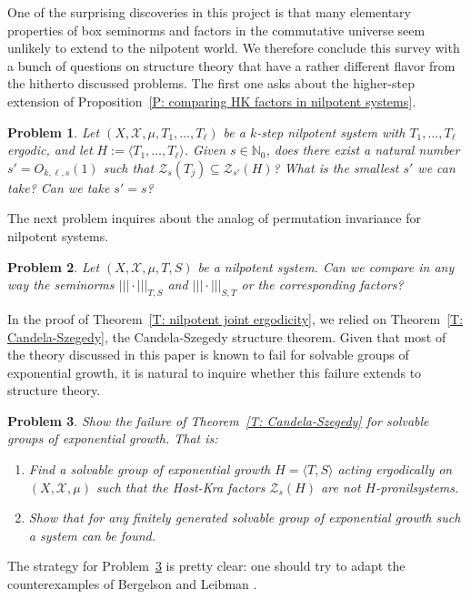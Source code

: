 \documentclass[11pt]{amsart}
\newtheorem{problem}{Problem}
\theoremstyle{definition}
\newcommand{\N}{{\mathbb N}}
\newcommand{\CX}{{\mathcal X}}
\newcommand{\CZ}{{\mathcal Z}}
\newcommand{\nnorm}[1]{\lvert\!|\!| #1|\!|\!\rvert}
\newcommand{\1}{{\mathbf{1}}}
\begin{document}
One of the surprising discoveries in this project is that many elementary properties of box seminorms and factors in the commutative universe seem unlikely to extend to the nilpotent world. We therefore conclude this survey with a bunch of questions on structure theory that have a rather different flavor from the hitherto discussed problems. The first one asks about the higher-step extension of Proposition~\ref{P: comparing HK factors in nilpotent systems}.
\begin{problem}\label{Pr: comparing factors}
    Let $(X, \CX, \mu, T_1, \ldots, T_\ell)$ be a $k$-step nilpotent system with $T_1, \ldots, T_\ell$ ergodic, and let $H := \langle T_1, \ldots, T_\ell\rangle$. Given $s\in\N_0$, does there exist a natural number $s' = O_{k,\ell,s}(1)$ such that $\CZ_s(T_j)\subseteq \CZ_{s'}(H)$? What is the smallest $s'$ we can take? Can we take $s'=s$?
\end{problem}

The next problem inquires about the analog of permutation invariance for nilpotent systems.
\begin{problem}
    Let $(X, \CX, \mu, T, S)$ be a nilpotent system. Can we compare in any way the seminorms $\nnorm{\cdot}_{T,S}$ and $\nnorm{\cdot}_{S,T}$ or the corresponding factors? 
\end{problem}

In the proof of Theorem~\ref{T: nilpotent joint ergodicity}, we relied on Theorem~\ref{T: Candela-Szegedy}, the Candela-Szegedy structure theorem. Given that most of the theory discussed in this paper is known to fail for solvable groups of exponential growth, it is natural to inquire whether this failure extends to structure theory.
\begin{problem}\label{Pr: solvable}
Show the failure of Theorem~\ref{T: Candela-Szegedy} for solvable groups of exponential growth. That is:
\begin{enumerate}
    \item Find a solvable group of exponential growth $H=\langle T,S\rangle$ acting ergodically on $(X, \CX, \mu)$  such that the Host-Kra factors $\CZ_s(H)$ are not $H$-pronilsystems.
    \item Show that for \textit{any} finitely generated solvable group of exponential growth such a system can be found.
\end{enumerate}
\end{problem}
The strategy for Problem~\ref{Pr: solvable} is pretty clear: one should try to adapt the counterexamples of Bergelson and Leibman \cite{BL02, BL04}.
\end{document}
